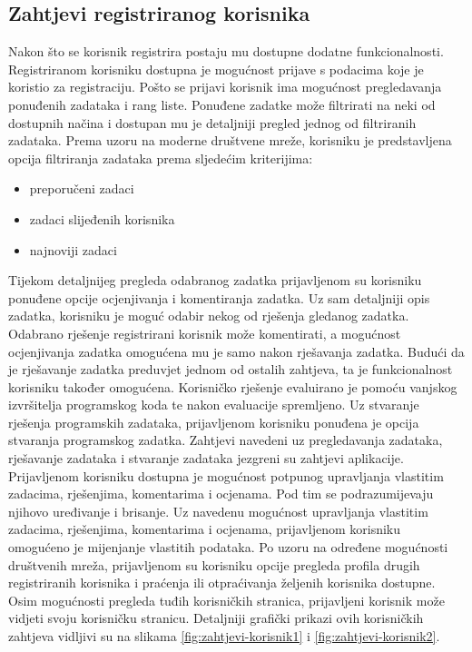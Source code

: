 \documentclass[times, utf8, zavrsni]{fer}
\begin{document}
			\subsection{Zahtjevi registriranog korisnika}
			Nakon što se korisnik registrira postaju mu dostupne dodatne funkcionalnosti. Registriranom korisniku dostupna je mogućnost prijave s podacima koje je koristio za registraciju. Pošto se prijavi korisnik ima mogućnost pregledavanja ponuđenih zadataka i rang liste. Ponuđene zadatke može filtrirati na neki od dostupnih načina i dostupan mu je detaljniji pregled jednog od filtriranih zadataka. Prema uzoru na moderne društvene mreže, korisniku je predstavljena opcija filtriranja zadataka prema sljedećim kriterijima: 
			\begin{itemize}
				\item preporučeni zadaci
				\item zadaci slijeđenih korisnika
				\item najnoviji zadaci
			\end{itemize}
			Tijekom detaljnijeg pregleda odabranog zadatka prijavljenom su korisniku ponuđene opcije ocjenjivanja i komentiranja zadatka. Uz sam detaljniji opis zadatka, korisniku je moguć odabir nekog od rješenja gledanog zadatka. Odabrano rješenje registrirani korisnik može komentirati, a mogućnost ocjenjivanja zadatka omogućena mu je samo nakon rješavanja zadatka. Budući da je rješavanje zadatka preduvjet jednom od ostalih zahtjeva, ta je funkcionalnost korisniku također omogućena. Korisničko rješenje evaluirano je pomoću vanjskog izvršitelja programskog koda te nakon evaluacije spremljeno. Uz stvaranje rješenja programskih zadataka, prijavljenom korisniku ponuđena je opcija stvaranja programskog zadatka. Zahtjevi navedeni uz pregledavanja zadataka, rješavanje zadataka i stvaranje zadataka jezgreni su zahtjevi aplikacije.\\ Prijavljenom korisniku dostupna je mogućnost potpunog upravljanja vlastitim zadacima, rješenjima, komentarima i ocjenama. Pod tim se podrazumijevaju njihovo uređivanje i brisanje. Uz navedenu mogućnost upravljanja vlastitim zadacima, rješenjima, komentarima i ocjenama, prijavljenom korisniku omogućeno je mijenjanje vlastitih podataka. Po uzoru na određene mogućnosti društvenih mreža, prijavljenom su korisniku opcije pregleda profila drugih registriranih korisnika i praćenja ili otpraćivanja željenih korisnika dostupne. Osim mogućnosti pregleda tuđih korisničkih stranica, prijavljeni korisnik može vidjeti svoju korisničku stranicu. Detaljniji grafički prikazi ovih korisničkih zahtjeva vidljivi su na slikama \ref{fig:zahtjevi-korisnik1} i \ref{fig:zahtjevi-korisnik2}.
\end{document}
